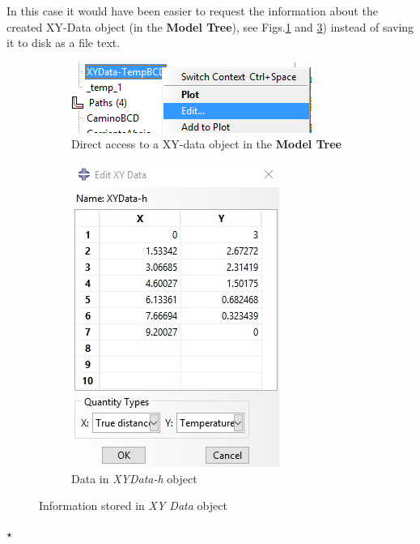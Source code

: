 \begin{itemize}
   In this case it would have been easier to request the information
   about the created XY-Data object (in the \textbf{Model Tree}), see
   Figs.\ref{post38} and \ref{post39}) instead of saving it to disk as
   a file text.
   \begin{figure}[!h]
     \centering
     \begin{subfigure}[!h]{0.45\textwidth}
       \includegraphics[width=\textwidth]{./body/images/post38}
       \caption{Direct access to a XY-data object in the \textbf{Model
           Tree}}
       \label{post38}
     \end{subfigure}\quad%
     \begin{subfigure}[!h]{0.450\textwidth}
       \includegraphics[width=\textwidth]{./body/images/30b.jpg}
       \caption{Data in \textit{XYData-h} object}
       \label{post39}
     \end{subfigure}%
     \caption{Information stored in \textit{XY Data} object}
   \end{figure}
 \end{itemize}

 \hspace{20mm}\hrulefill$\star$\hrulefill\hspace{20mm}
